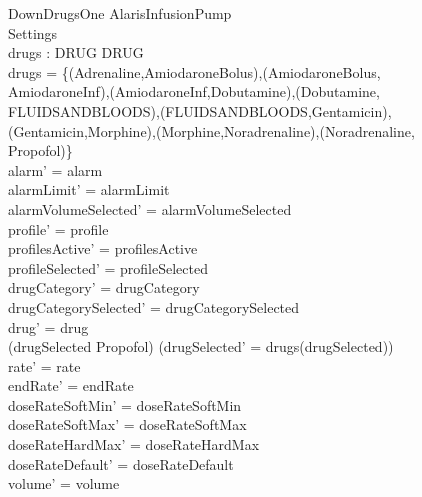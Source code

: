 \begin{schema}{DownDrugsOne}
	\Delta AlarisInfusionPump\\
	 Settings\\
	drugs : DRUG \rel DRUG\\
	\where
	drugs = \{(Adrenaline,AmiodaroneBolus),(AmiodaroneBolus,\\
	AmiodaroneInf),(AmiodaroneInf,Dobutamine),(Dobutamine,\\
	FLUIDSANDBLOODS),(FLUIDSANDBLOODS,Gentamicin),\\
	\pagebreak
	(Gentamicin,Morphine),(Morphine,Noradrenaline),(Noradrenaline,\\
	Propofol)\}\\
	alarm' = alarm\\
	alarmLimit' = alarmLimit\\
	alarmVolumeSelected' = alarmVolumeSelected\\
	profile' = profile\\
	profilesActive' = profilesActive\\  
	  profileSelected' = profileSelected\\
	drugCategory' = drugCategory\\ drugCategorySelected' = drugCategorySelected\\
	drug' = drug\\ 
	(drugSelected \neq Propofol) \land (drugSelected' = drugs(drugSelected))\\
	rate' = rate\\
	endRate' = endRate\\
	doseRateSoftMin' = doseRateSoftMin\\
	doseRateSoftMax' = doseRateSoftMax\\
	doseRateHardMax' = doseRateHardMax\\
	doseRateDefault' = doseRateDefault\\
	volume' = volume\\

\end{schema}
